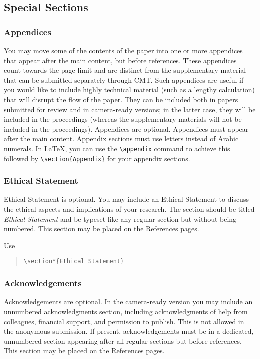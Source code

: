 \documentclass{article}
\begin{document}
\subsection{Special Sections}

\subsubsection{Appendices}
You may move some of the contents of the paper into one or more appendices that appear after the main content, but before references. These appendices count towards the page limit and are distinct from the supplementary material that can be submitted separately through CMT. Such appendices are useful if you would like to include highly technical material (such as a lengthy calculation) that will disrupt the flow of the paper. They can be included both in papers submitted for review and in camera-ready versions; in the latter case, they will be included in the proceedings (whereas the supplementary materials will not be included in the proceedings).
Appendices are optional. Appendices must appear after the main content.
Appendix sections must use letters instead of Arabic numerals. In \LaTeX,  you can use the {\tt \textbackslash{}appendix} command to achieve this followed by  {\tt \textbackslash section\{Appendix\}} for your appendix sections.

\subsubsection{Ethical Statement}

Ethical Statement is optional. You may include an Ethical Statement to discuss  the ethical aspects and implications of your research. The section should be titled \emph{Ethical Statement} and be typeset like any regular section but without being numbered. This section may be placed on the References pages.

Use
\begin{quote}
    {\tt \textbackslash{}section*\{Ethical Statement\}}
\end{quote}

\subsubsection{Acknowledgements}

Acknowledgements are optional. In the camera-ready version you may include an unnumbered acknowledgments section, including acknowledgments of help from colleagues, financial support, and permission to publish. This is not allowed in the anonymous submission. If present, acknowledgements must be in a dedicated, unnumbered section appearing after all regular sections but before references.  This section may be placed on the References pages.
\end{document}
